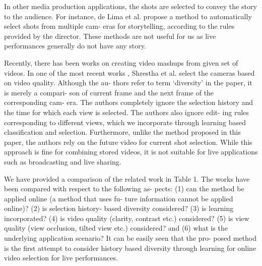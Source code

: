 \documentclass{sig-alternate}
\begin{document}
In other media production applications, the shots are selected to
convey the story to the audience. For instance, de Lima et al. \cite{7} propose a method to automatically select shots from multiple cam-
eras for storytelling, according to the rules provided by the director.
These methods are not useful for us as live performances generally
do not have any story.

Recently, there has been works on creating video mashups from
given set of videos. In one of the most recent works \cite{15}, Shrestha
et al. select the cameras based on video quality. Although the au-
thors refer to term ‘diversity’ in the paper, it is merely a compari-
son of current frame and the next frame of the corresponding cam-
era. The authors completely ignore the selection history and the
time for which each view is selected. The authors also ignore edit-
ing rules corresponding to different views, which we incorporate
through learning based classification and selection. Furthermore,
unlike the method proposed in this paper, the authors rely on the
future video for current shot selection. While this approach is fine
for combining stored videos, it is not suitable for live applications
such as broadcasting and live sharing.

We have provided a comparison of the related work in Table 1.
The works have been compared with respect to the following as-
pects: (1) can the method be applied online (a method that uses fu-
ture information cannot be applied online)? (2) is selection history-
based diversity considered? (3) is learning incorporated? (4) is
video quality (clarity, contrast etc.) considered? (5) is view quality
(view occlusion, tilted view etc.) considered? and (6) what is the
underlying application scenario? It can be easily seen that the pro-
posed method is the first attempt to consider history based diversity
through learning for online video selection for live performances.




  
 
\end{document}
